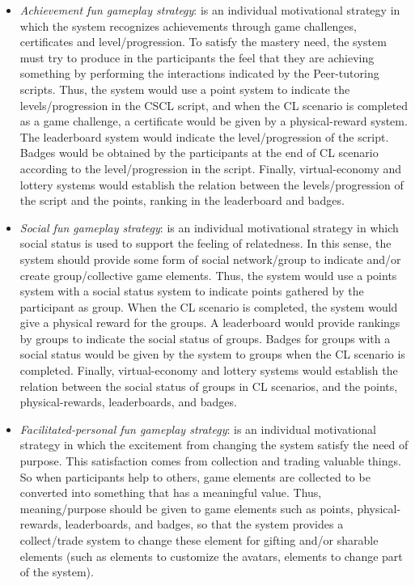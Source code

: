 \begin{itemize}
\item \emph{Achievement fun gameplay strategy}:
is an individual motivational strategy in which the system recognizes achievements through game challenges, certificates and level/progression. To satisfy the mastery need, the system must try to produce in the participants the feel that they are achieving something by performing the interactions indicated by the Peer-tutoring scripts. Thus, the system would use a point system to indicate the levels/progression in the CSCL script, and when the CL scenario is completed as a game challenge, a certificate would be given by a physical-reward system. The leaderboard system would indicate the level/progression of the script. Badges would be obtained by the participants at the end of CL scenario according to the level/progression in the script. Finally, virtual-economy and lottery systems would establish the relation between the levels/progression of the script and the points, ranking in the leaderboard and badges.

\item \emph{Social fun gameplay strategy}:
is an individual motivational strategy in which social status is used to support the feeling of relatedness. In this sense, the system should provide some form of social network/group to indicate and/or create group/collective game elements. Thus, the system would use a points system with a social status system to indicate points gathered by the participant as group. When the CL scenario is completed, the system would give a physical reward for the groups. A leaderboard would provide rankings by groups to indicate the social status of groups. Badges for groups with a social status would be given by the system to groups when the CL scenario is completed. Finally, virtual-economy and lottery systems would establish the relation between the social status of groups in CL scenarios, and the points, physical-rewards, leaderboards, and badges.

\item \emph{Facilitated-personal fun gameplay strategy}:
is an individual motivational strategy in which the excitement from changing the system satisfy the need of purpose. This satisfaction comes from collection and trading valuable things. So when participants help to others, game elements are collected to be converted into something that has a meaningful value. Thus, meaning/purpose should be given to game elements such as points, physical-rewards, leaderboards, and badges, so that the system provides a collect/trade system to change these element for gifting and/or sharable elements (such as elements to customize the avatars, elements to change part of the system).
\end{itemize}

